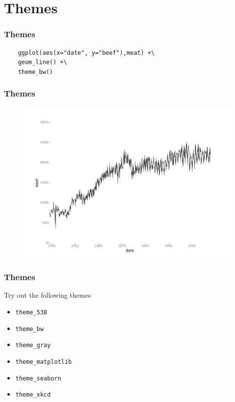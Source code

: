 \documentclass{beamer}
\begin{document}
\section{Themes}
\begin{frame}[fragile]
\frametitle{Themes}
\Large
	\begin{framed}
	\begin{verbatim}
	ggplot(aes(x="date", y="beef"),meat) +\
	geom_line() +\
	theme_bw()
	\end{verbatim}
	\end{framed}
\end{frame}
\begin{frame}
\frametitle{Themes}
\Large
\begin{figure}
\centering
\includegraphics[width=1.0\linewidth]{meat_theme_bw}
\end{figure}

\end{frame}
\begin{frame}
\frametitle{Themes}
\Large
Try out the following themes
	\begin{itemize}
		\item	\texttt{theme\_538}
		\item	\texttt{theme\_bw}
		\item	\texttt{theme\_gray}
		\item	\texttt{theme\_matplotlib}
		\item	\texttt{theme\_seaborn}
		\item	\texttt{theme\_xkcd}
	\end{itemize}
	
\end{frame}
\end{document}
